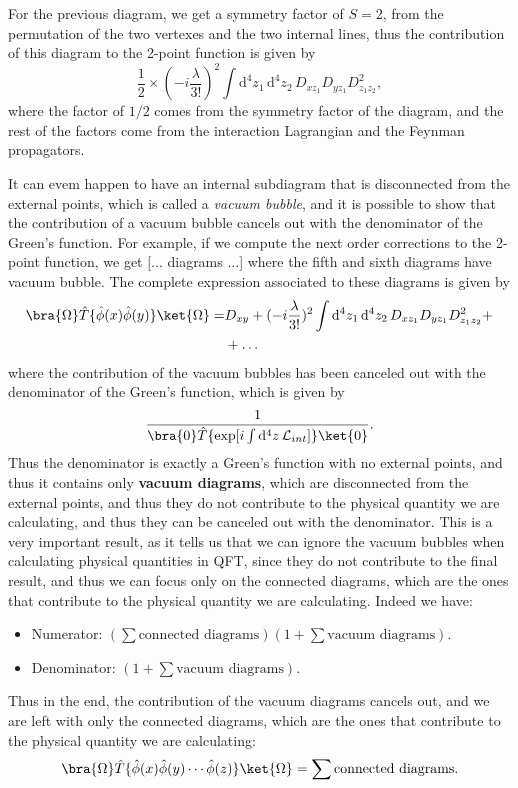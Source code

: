 For the previous diagram, we get a symmetry factor of \(S=2\), from the permutation of the two vertexes and the two internal lines, thus the contribution of this diagram to the 2-point function is given by
\[
    \frac{1}{2} \times (-i \frac{\lambda}{3!})^2 \int \mathrm{d}^4 z_1 \, \mathrm{d}^4 z_2 \, D_{x z_1} D_{y z_1} D_{z_1 z_2}^2,
\]
where the factor of \(1/2\) comes from the symmetry factor of the diagram, and the rest of the factors come from the interaction Lagrangian and the Feynman propagators.

It can evem happen to have an internal subdiagram that is disconnected from the external points, which is called a \textit{vacuum bubble}, and it is possible to show that the contribution of a vacuum bubble cancels out with the denominator of the Green's function. For example, if we compute the next order corrections to the 2-point function, we get
    [... diagrams ...]
where the fifth and sixth diagrams have vacuum bubble. The complete expression associated to these diagrams is given by
\[
    \begin{aligned}
        \bra{\Omega} \hat{T} \{ \hat{\phi} (x) \hat{\phi} (y) \} \ket{\Omega} = & D_{xy} + (-i \frac{\lambda}{3!})^2 \int \mathrm{d}^4 z_1 \, \mathrm{d}^4 z_2 \, D_{x z_1} D_{y z_1} D_{z_1 z_2}^2 + \\
                                                                                & + \dots
    \end{aligned}
\]
where the contribution of the vacuum bubbles has been canceled out with the denominator of the Green's function, which is given by
\[
    \frac{1}{\bra{0} \hat{T} \{ \exp[ i \int \mathrm{d}^4 z \, \mathcal{L}_{int} ] \} \ket{0}}.
\]
Thus the denominator is exactly a Green's function with no external points, and thus it contains only \textbf{vacuum diagrams}, which are disconnected from the external points, and thus they do not contribute to the physical quantity we are calculating, and thus they can be canceled out with the denominator. This is a very important result, as it tells us that we can ignore the vacuum bubbles when calculating physical quantities in QFT, since they do not contribute to the final result, and thus we can focus only on the connected diagrams, which are the ones that contribute to the physical quantity we are calculating. Indeed we have:
\begin{itemize}
    \item Numerator: \(\left(\sum \text{connected diagrams}\right)\left(1 + \sum \text{vacuum diagrams} \right)\).
    \item Denominator: \(\left(1 + \sum \text{vacuum diagrams}\right)\).
\end{itemize}
Thus in the end, the contribution of the vacuum diagrams cancels out, and we are left with only the connected diagrams, which are the ones that contribute to the physical quantity we are calculating:
\[
    \bra{\Omega} \hat{T} \{ \hat{\phi} (x) \hat{\phi} (y) \cdots \hat{\phi} (z) \} \ket{\Omega} = \sum \text{connected diagrams}.
\]

